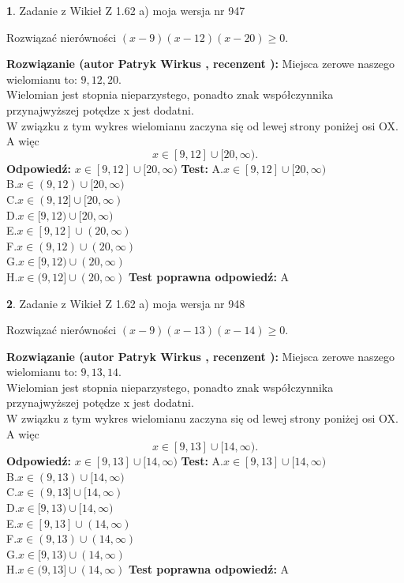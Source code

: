 \documentclass[12pt, a4paper]{article}
\theoremstyle{definition} %
\newtheorem{zad}{}
\newcommand{\zadStart}[1]{\begin{zad}#1\newline}
\newcommand{\zadStop}{\end{zad}}
\newcommand{\rozwStart}[2]{\noindent \textbf{Rozwiązanie (autor #1 , recenzent #2): }\newline}
\newcommand{\rozwStop}{\newline}
\newcommand{\odpStart}{\noindent \textbf{Odpowiedź:}\newline}
\newcommand{\odpStop}{\newline}
\newcommand{\testStart}{\noindent \textbf{Test:}\newline}
\newcommand{\testStop}{\newline}
\newcommand{\kluczStart}{\noindent \textbf{Test poprawna odpowiedź:}\newline}
\newcommand{\kluczStop}{\newline}
\begin{document}
\zadStart{Zadanie z Wikieł Z 1.62 a) moja wersja nr 947}

Rozwiązać nierówności $(x-9)(x-12)(x-20)\ge0$.
\zadStop
\rozwStart{Patryk Wirkus}{}
Miejsca zerowe naszego wielomianu to: $9, 12, 20$.\\
Wielomian jest stopnia nieparzystego, ponadto znak współczynnika przy\linebreak najwyższej potędze x jest dodatni.\\ W związku z tym wykres wielomianu zaczyna się od lewej strony poniżej osi OX. A więc $$x \in [9,12] \cup [20,\infty).$$
\rozwStop
\odpStart
$x \in [9,12] \cup [20,\infty)$
\odpStop
\testStart
A.$x \in [9,12] \cup [20,\infty)$\\
B.$x \in (9,12) \cup [20,\infty)$\\
C.$x \in (9,12] \cup [20,\infty)$\\
D.$x \in [9,12) \cup [20,\infty)$\\
E.$x \in [9,12] \cup (20,\infty)$\\
F.$x \in (9,12) \cup (20,\infty)$\\
G.$x \in [9,12) \cup (20,\infty)$\\
H.$x \in (9,12] \cup (20,\infty)$
\testStop
\kluczStart
A
\kluczStop



\zadStart{Zadanie z Wikieł Z 1.62 a) moja wersja nr 948}

Rozwiązać nierówności $(x-9)(x-13)(x-14)\ge0$.
\zadStop
\rozwStart{Patryk Wirkus}{}
Miejsca zerowe naszego wielomianu to: $9, 13, 14$.\\
Wielomian jest stopnia nieparzystego, ponadto znak współczynnika przy\linebreak najwyższej potędze x jest dodatni.\\ W związku z tym wykres wielomianu zaczyna się od lewej strony poniżej osi OX. A więc $$x \in [9,13] \cup [14,\infty).$$
\rozwStop
\odpStart
$x \in [9,13] \cup [14,\infty)$
\odpStop
\testStart
A.$x \in [9,13] \cup [14,\infty)$\\
B.$x \in (9,13) \cup [14,\infty)$\\
C.$x \in (9,13] \cup [14,\infty)$\\
D.$x \in [9,13) \cup [14,\infty)$\\
E.$x \in [9,13] \cup (14,\infty)$\\
F.$x \in (9,13) \cup (14,\infty)$\\
G.$x \in [9,13) \cup (14,\infty)$\\
H.$x \in (9,13] \cup (14,\infty)$
\testStop
\kluczStart
A
\kluczStop
\end{document}

